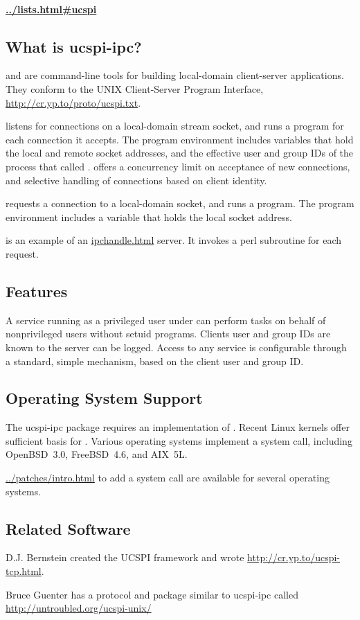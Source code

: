 \documentclass{book}
\begin{document}
\paragraph{\href{A mailing list for ucspi-ipc and general ucspi discussion}{../lists.html#ucspi}}


\subsection{What is ucspi-ipc?}
 and  are command-line tools for
building local-domain client-server applications.  They conform to the
UNIX Client-Server Program Interface,
\href{UCSPI}{http://cr.yp.to/proto/ucspi.txt}.

 listens for connections on a local-domain
stream socket, and runs a program for each connection it accepts.  The
program environment includes variables that hold the local and remote
socket addresses, and the effective user and group IDs of the process
that called .   offers a concurrency limit
on acceptance of new connections, and selective handling of
connections based on client identity.

 requests a connection to a local-domain socket,
and runs a program.  The program environment includes a variable that
holds the local socket address.

 is an example of an \href{\cmd{ipchandle}}{ipchandle.html}
server.  It invokes a perl subroutine for each request.

\subsection{Features}
A service running as a privileged user under  can perform tasks
on behalf of nonprivileged users without setuid programs.  Clients user and
group IDs are known to the server can be logged.  Access to any service is
configurable through a standard, simple mechanism, based on the client user and
group ID.

\subsection{Operating System Support}
The ucspi-ipc package requires an implementation of .
Recent Linux kernels offer sufficient basis for .
Various operating systems implement a  system call,
including OpenBSD~3.0, FreeBSD~4.6, and AIX~5L.

\href{Patches}{../patches/intro.html} to add a  system
call are available for several operating systems.


\subsection{Related Software}
D.J. Bernstein created the UCSPI framework and wrote
\href{ucspi-tcp}{http://cr.yp.to/ucspi-tcp.html}.

Bruce Guenter has a protocol and package similar to ucspi-ipc called
\href{ucspi-unix}{http://untroubled.org/ucspi-unix/}
\end{document}

